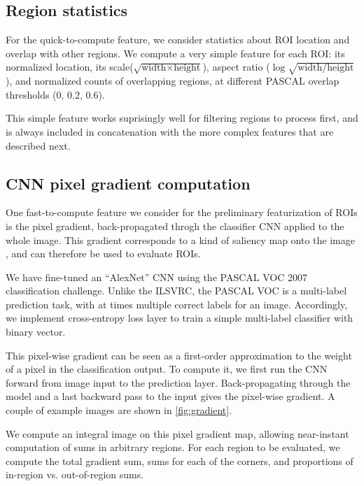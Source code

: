 \subsection{Region statistics}\label{sec:region}
For the quick-to-compute feature, we consider statistics about ROI location and overlap with other regions.
We compute a very simple feature for each ROI: its normalized location,
its scale($\sqrt{\text{width} \times \text{height}}$),
aspect ratio ($\log \sqrt{\text{width} / \text{height}}$),
and normalized counts of overlapping regions, at different PASCAL overlap  thresholds (0, 0.2, 0.6).

This simple feature works suprisingly well for filtering regions to process first, and is always included in concatenation with the more complex features that are described next.

\subsection{CNN pixel gradient computation}\label{sec:gradient}

One fast-to-compute feature we consider for the preliminary featurization of ROIs is the pixel gradient, back-propagated throgh the classifier CNN applied to the whole image.
This gradient corresponds to a kind of saliency map onto the image \cite{Simonyan-ICLR-2014}, and can therefore be used to evaluate ROIs.

We have fine-tuned an ``AlexNet'' \cite{Krizhevsky-NIPS-2012} CNN using the PASCAL VOC 2007 classification challenge.
Unlike the ILSVRC, the PASCAL VOC is a multi-label prediction task, with at times multiple correct labels for an image.
Accordingly, we implement cross-entropy loss layer to train a simple multi-label classifier with binary vector.

This pixel-wise gradient can be seen as a first-order approximation to the weight of a pixel in the classification output.
To compute it, we first run the CNN forward from image input to the prediction layer.
Back-propagating through the model and a last backward pass to the input gives the pixel-wise gradient.
A couple of example images are shown in \autoref{fig:gradient}.

We compute an integral image on this pixel gradient map, allowing near-instant computation of sums in arbitrary regions.
For each region to be evaluated, we compute the total gradient sum, sums for each of the corners, and proportions of in-region vs. out-of-region sums.


